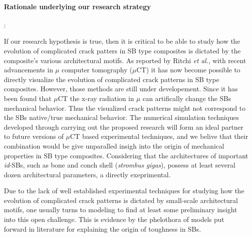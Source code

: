 \documentclass[10pt,letterpaper]{article}
\begin{document}
\paragraph{Rationale underlying our research strategy}:


If our research hypothesis is true, then it is critical to be able to study  how the evolution of complicated crack patters in SB  type composites is dictated by the composite's various  architectural motifs.  As reported by Ritchi \textit{et al.}\cite{XXX}, with recent advancements in $\mu$ computer tomography ($\mu$CT) it has now become possible to directly visualize  the evolution of complicated crack patterns in SB type composites. However,  those methods  are still under developement.  Since it has been found that $\mu$CT the  x-ray radiation in $\mu$ can artifically change the  SBs mechanical behavior.  Thus the  visualized crack patterns might not correspond to the   SBs native/true mechanical behavior.   The numerical simulation techniques developed through carrying out the  proposed research will form an ideal partner to future versions of $\mu$CT  based experimental techniques, and we belive that their combination would be  give unparalled insigh into the origin of mechanical properties in SB type composites. Considering that the architectures of important \textit{id}-SBs, such as bone and conch shell (\textit{strombus gigas}), possess at least several dozen architectural parameters, a directly exeprimental.

Due to the lack of  well established  experimental techniques for studying how  the  evolution of complicated crack patterns is dictated by  small-scale architectural motifs, one usually turns to modeling to find at least some preliminary insight into this open challenge.  This is evidence by the phelothora of  models put forward in literature for explaining the origin  of toughness in SBs.
\end{document}
